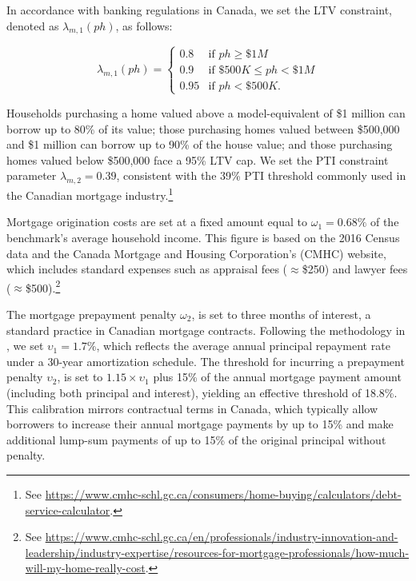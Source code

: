 \documentclass[parskip=full]{article}
\begin{document}
In accordance with banking regulations in Canada, we set the LTV constraint, denoted as $\lambda_{m,1}(ph)$, as follows:

\begin{equation*}
\lambda_{m,1}(ph) = \begin{cases}
0.8 &\text{if $ph\geq \$1M$}\\
0.9 &\text{if $\$500K\leq ph< \$1M$}\\
0.95 &\text{if $ph < \$500K$}.
\end{cases}
\end{equation*}

\noindent Households purchasing a home valued above a model-equivalent of \$1 million can borrow up to 80\% of its value; those purchasing homes valued between \$500,000 and \$1 million can borrow up to 90\% of the house value; and those purchasing homes valued below \$500,000 face a 95\% LTV cap. We set the PTI constraint parameter $\lambda_{m,2}=0.39$, consistent with the 39\% PTI threshold commonly used in the Canadian mortgage industry.\footnote{See \url{https://www.cmhc-schl.gc.ca/consumers/home-buying/calculators/debt-service-calculator}.}

Mortgage origination costs are set at a fixed amount equal to $\omega_{1}=0.68\%$ of the benchmark's average household income. This figure is based on the 2016 Census data and the Canada Mortgage and Housing Corporation's (CMHC) website, which includes standard expenses such as appraisal fees ($\approx$\$250) and lawyer fees ($\approx$\$500).\footnote{See \url{https://www.cmhc-schl.gc.ca/en/professionals/industry-innovation-and-leadership/industry-expertise/resources-for-mortgage-professionals/how-much-will-my-home-really-cost}.}

The mortgage prepayment penalty $\omega_{2}$, is set to three months of interest, a standard practice in Canadian mortgage contracts. Following the methodology in \citet{kkk-2021}, we set $\upsilon_{1}=1.7\%$, which reflects the average annual principal repayment rate under a 30-year amortization schedule. The threshold for incurring a prepayment penalty $\upsilon_{2}$, is set to $1.15 \times \upsilon_{1}$ plus 15\% of the annual mortgage payment amount (including both principal and interest), yielding an effective threshold of 18.8\%. This calibration mirrors contractual terms in Canada, which typically allow borrowers to increase their annual mortgage payments by up to 15\% and make additional lump-sum payments of up to 15\% of the original principal without penalty.
\end{document}

